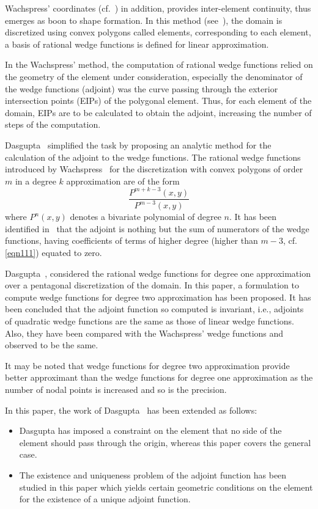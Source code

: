 \documentclass[automatic-bibliography, defaultmaths=false]{univsci}
\begin{document}
Wachspress' coordinates (cf.~\cite{wach}) in addition, provides inter-element
continuity, thus emerges as boon to shape formation. In this method
(see~\cite{wachs}), the domain is discretized using convex polygons called
elements, corresponding to each element, a basis of rational wedge functions is
defined for linear approximation.

In the Wachspress\rq{} method, the computation of rational wedge functions
relied on the geometry of the element under consideration, especially the
denominator of the wedge functions (adjoint) was the curve passing through the
exterior intersection points (EIPs) of the polygonal element. Thus, for each
element of the domain, EIPs are to be calculated to obtain the adjoint,
increasing the number of steps of the computation.

Dasgupta~\cite{das} simplified the task by proposing an analytic method for the
calculation of the adjoint to the wedge functions. The rational wedge functions
introduced by Wachspress~\cite{wachs} for the discretization with convex
polygons of order $m$ in a degree $k$ approximation are of the form
\begin{equation}
  \frac{P^{m+k-3}(x,y)}{P^{m-3}(x,y)} \label{eqn111}
\end{equation}
where $P^n(x,y)$ denotes a bivariate polynomial of degree  $n$. It has been
identified in~\cite{das} that the adjoint is nothing but the sum of numerators
of the wedge functions, having coefficients of terms of higher degree (higher
than $m-3$, cf. \autoref{eqn111}) equated to zero.

Dasgupta~\cite{das}, considered the rational wedge functions for degree one
approximation over a pentagonal discretization of the domain. In this paper, a
formulation to compute wedge functions for degree two approximation has been
proposed. It has been concluded that the adjoint function so computed is
invariant, i.e., adjoints of quadratic wedge functions are the same as those of
linear wedge functions. Also, they have been compared with the Wachspress\rq{}
wedge functions and observed to be the same.

It may be noted that wedge functions for degree two approximation provide better
approximant than the wedge functions for degree one approximation as the number
of nodal points is increased and so is the precision.

In this paper, the work of Dasgupta~\cite{das} has been extended as follows:
\begin{itemize}
  \item Dasgupta has imposed a constraint on the element that no side of
        the element should pass through the origin, whereas this paper covers the
        general case.
  \item The existence and uniqueness problem of the adjoint function has
        been studied in this paper which yields certain geometric conditions on the
        element for the existence of a unique adjoint function.
\end{itemize}
\end{document}
